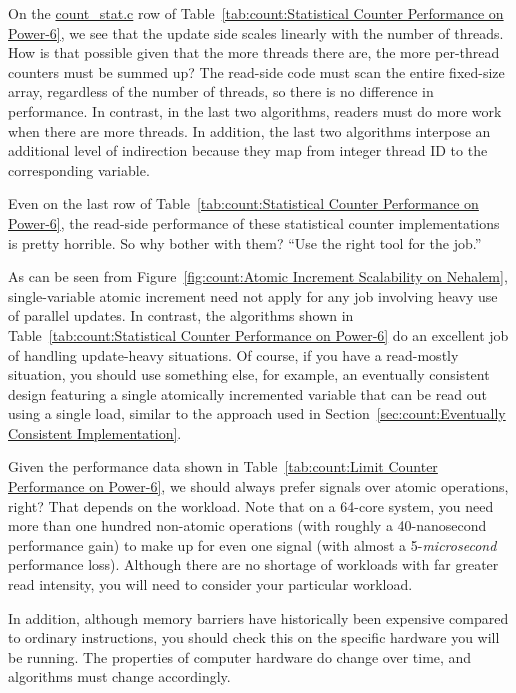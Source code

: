\begin{enumerate}
\QuickQ{}
	On the \url{count_stat.c} row of
	Table~\ref{tab:count:Statistical Counter Performance on Power-6},
	we see that the update side scales linearly with the number of
	threads.
	How is that possible given that the more threads there are,
	the more per-thread counters must be summed up?
\QuickA{}
	The read-side code must scan the entire fixed-size array, regardless
	of the number of threads, so there is no difference in performance.
	In contrast, in the last two algorithms, readers must do more
	work when there are more threads.
	In addition, the last two algorithms interpose an additional
	level of indirection because they map from integer thread ID
	to the corresponding  variable.

\QuickQ{}
	Even on the last row of
	Table~\ref{tab:count:Statistical Counter Performance on Power-6},
	the read-side performance of these statistical counter
	implementations is pretty horrible.
	So why bother with them?
\QuickA{}
	``Use the right tool for the job.''

	As can be seen from
	Figure~\ref{fig:count:Atomic Increment Scalability on Nehalem},
	single-variable atomic increment need not apply for any job
	involving heavy use of parallel updates.
	In contrast, the algorithms shown in
	Table~\ref{tab:count:Statistical Counter Performance on Power-6}
	do an excellent job of handling update-heavy situations.
	Of course, if you have a read-mostly situation, you should
	use something else, for example, an eventually consistent design
	featuring a single atomically incremented
	variable that can be read out using a single load,
	similar to the approach used in
	Section~\ref{sec:count:Eventually Consistent Implementation}.

\QuickQ{}
	Given the performance data shown in
	Table~\ref{tab:count:Limit Counter Performance on Power-6},
	we should always prefer signals over atomic operations, right?
\QuickA{}
	That depends on the workload.
	Note that on a 64-core system, you need more than
	one hundred non-atomic operations (with roughly
	a 40-nanosecond performance gain) to make up for even one
	signal (with almost a 5-\emph{microsecond} performance loss).
	Although there are no shortage of workloads with far greater
	read intensity, you will need to consider your particular
	workload.

	In addition, although memory barriers have historically been
	expensive compared to ordinary instructions, you should
	check this on the specific hardware you will be running.
	The properties of computer hardware do change over time,
	and algorithms must change accordingly.


\end{enumerate}
